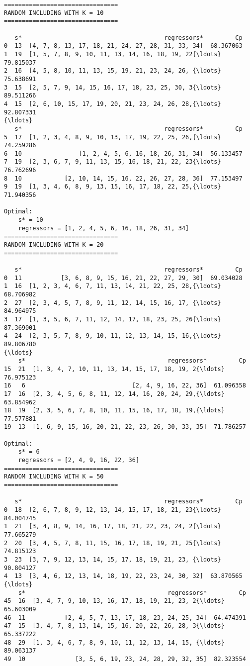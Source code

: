 \documentclass[11pt]{article}
\begin{document}
    \begin{Verbatim}[commandchars=\\\{\}]
================================
RANDOM INCLUDING WITH K = 10
================================

   s*                                        regressors*         Cp
0  13  [4, 7, 8, 13, 17, 18, 21, 24, 27, 28, 31, 33, 34]  68.367063
1  19  [1, 5, 7, 8, 9, 10, 11, 13, 14, 16, 18, 19, 22{\ldots}  79.815037
2  16  [4, 5, 8, 10, 11, 13, 15, 19, 21, 23, 24, 26, {\ldots}  75.638691
3  15  [2, 5, 7, 9, 14, 15, 16, 17, 18, 23, 25, 30, 3{\ldots}  89.511266
4  15  [2, 6, 10, 15, 17, 19, 20, 21, 23, 24, 26, 28,{\ldots}  92.807331
{\ldots}
   s*                                        regressors*         Cp
5  17  [1, 2, 3, 4, 8, 9, 10, 13, 17, 19, 22, 25, 26,{\ldots}  74.259286
6  10                [1, 2, 4, 5, 6, 16, 18, 26, 31, 34]  56.133457
7  19  [2, 3, 6, 7, 9, 11, 13, 15, 16, 18, 21, 22, 23{\ldots}  76.762696
8  10            [2, 10, 14, 15, 16, 22, 26, 27, 28, 36]  77.153497
9  19  [1, 3, 4, 6, 8, 9, 13, 15, 16, 17, 18, 22, 25,{\ldots}  71.940356

Optimal:
	s* = 10
	regressors = [1, 2, 4, 5, 6, 16, 18, 26, 31, 34]
================================
RANDOM INCLUDING WITH K = 20
================================

   s*                                        regressors*         Cp
0  11           [3, 6, 8, 9, 15, 16, 21, 22, 27, 29, 30]  69.034028
1  16  [1, 2, 3, 4, 6, 7, 11, 13, 14, 21, 22, 25, 28,{\ldots}  68.706982
2  27  [2, 3, 4, 5, 7, 8, 9, 11, 12, 14, 15, 16, 17, {\ldots}  84.964975
3  17  [1, 3, 5, 6, 7, 11, 12, 14, 17, 18, 23, 25, 26{\ldots}  87.369001
4  24  [2, 3, 5, 7, 8, 9, 10, 11, 12, 13, 14, 15, 16,{\ldots}  89.806780
{\ldots}
    s*                                        regressors*         Cp
15  21  [1, 3, 4, 7, 10, 11, 13, 14, 15, 17, 18, 19, 2{\ldots}  76.975123
16   6                              [2, 4, 9, 16, 22, 36]  61.096358
17  16  [2, 3, 4, 5, 6, 8, 11, 12, 14, 16, 20, 24, 29,{\ldots}  63.854962
18  19  [2, 3, 5, 6, 7, 8, 10, 11, 15, 16, 17, 18, 19,{\ldots}  77.577881
19  13  [1, 6, 9, 15, 16, 20, 21, 22, 23, 26, 30, 33, 35]  71.786257

Optimal:
	s* = 6
	regressors = [2, 4, 9, 16, 22, 36]
================================
RANDOM INCLUDING WITH K = 50
================================

   s*                                        regressors*         Cp
0  18  [2, 6, 7, 8, 9, 12, 13, 14, 15, 17, 18, 21, 23{\ldots}  84.004745
1  21  [3, 4, 8, 9, 14, 16, 17, 18, 21, 22, 23, 24, 2{\ldots}  77.665279
2  20  [3, 4, 5, 7, 8, 11, 15, 16, 17, 18, 19, 21, 25{\ldots}  74.815123
3  23  [3, 7, 9, 12, 13, 14, 15, 17, 18, 19, 21, 23, {\ldots}  90.804127
4  13  [3, 4, 6, 12, 13, 14, 18, 19, 22, 23, 24, 30, 32]  63.870565
{\ldots}
    s*                                        regressors*         Cp
45  16  [3, 4, 7, 9, 10, 13, 16, 17, 18, 19, 21, 23, 2{\ldots}  65.603009
46  11           [2, 4, 5, 7, 13, 17, 18, 23, 24, 25, 34]  64.474391
47  15  [3, 4, 7, 8, 13, 14, 15, 16, 20, 22, 26, 28, 3{\ldots}  65.337222
48  29  [1, 3, 4, 6, 7, 8, 9, 10, 11, 12, 13, 14, 15, {\ldots}  89.063137
49  10              [3, 5, 6, 19, 23, 24, 28, 29, 32, 35]  82.323554


\end{Verbatim}
\end{document}
